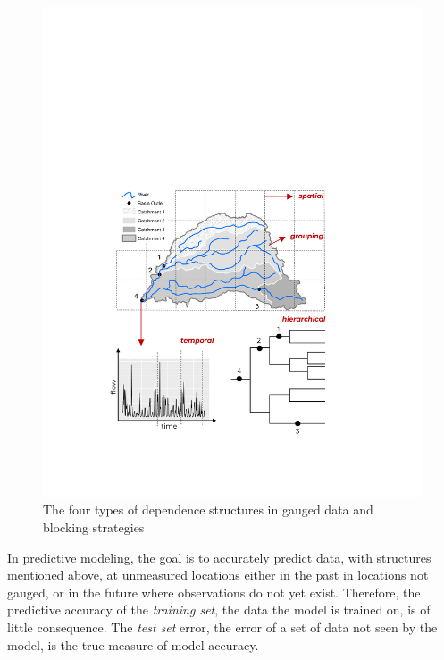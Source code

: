 \begin{figure}[ht]
	\centering
	\includegraphics[width=18cm,trim={2cm 3.2cm 0 10.2cm},clip=true]{plots/structured.pdf}
	\caption{The four types of dependence structures in gauged data and blocking strategies} 
	\label{fig:structured}
\end{figure}

In predictive modeling, the goal is to accurately predict data, with structures mentioned above, at unmeasured locations either in the past in locations not gauged, or in the future where observations do not yet exist. Therefore, the predictive accuracy of the \textit{training set}, the data the model is trained on, is of little consequence. The \textit{test set} error, the error of a set of data not seen by the model, is the true measure of model accuracy. 

